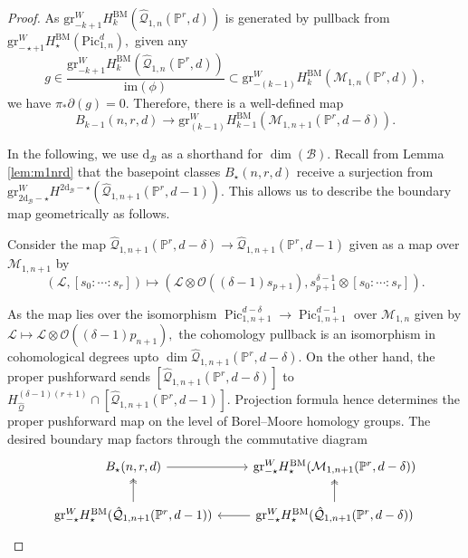 \documentclass[12pt,reqno]{amsart}
\theoremstyle{definition}
\theoremstyle{definition}
\theoremstyle{definition}
\theoremstyle{definition}
\DeclareMathOperator{\Pic}{Pic}
\newcommand{\PP}{\mathbb{P}}
\newcommand{\gr}{\mathrm{gr}}
\begin{document}
\begin{proof}
  As $\mathrm{gr}^W_{-k+1}H_k^{\mathrm{BM}}(\hat{\mathcal{Q}}_{1,n}(\mathbb{P}^r,d))$ is generated by pullback from $\mathrm{gr}^W_{-\star+1}H_\star^{\mathrm{BM}}({\mathrm{Pic}}^d_{1,n}),$ given any $$g\in \frac{\mathrm{gr}^W_{-k+1}H_k^{\mathrm{BM}}(\hat{\mathcal{Q}}_{1,n}(\mathbb{P}^r,d))}{\mathrm{im}(\phi)}\subset \gr^W_{-(k-1)}H_k^{\mathrm{BM}}(\mathcal{M}_{1,n}(\PP^r,d)),$$ we have $\pi_* \partial (g) = 0.$ Therefore, there is a well-defined map $$B_{k-1}(n,r,d)\to \gr^W_{(k-1)}H_{k-1}^{\mathrm{BM}}(\mathcal{M}_{1,n+1}(\PP^r,d-\delta)).$$

  In the following, we use $\mathrm{d}_\mathcal{B}$ as a shorthand for $\dim(\mathcal{B}).$ Recall from Lemma \ref{lem:m1nrd} that the basepoint classes $B_{\star}(n,r,d)$ receive a surjection from $\gr^W_{2\mathrm{d}_\mathcal{B}-\star}H^{2\mathrm{d}_\mathcal{B}-\star}(\hat{\mathcal{Q}}_{1,n+1}(\PP^r,d-1)).$ This allows us to describe the boundary map geometrically as follows.

  Consider the map $\hat{\mathcal{Q}}_{1,n+1}(\PP^r,d-\delta)\to \hat{\mathcal{Q}}_{1,n+1}(\PP^r,d-1)$ given as a map over $\mathcal{M}_{1,n+1}$ by $$(\mathcal{L}, [s_0:\cdots:s_r])\mapsto (\mathcal{L}\otimes \mathcal{O}((\delta-1)s_{p+1}), s_{p+1}^{\delta-1}\otimes [s_0:\cdots:s_r]).$$

  As the map lies over the isomorphism $\Pic_{1,n+1}^{d-\delta}\to \Pic_{1,n+1}^{d-1}$ over $\mathcal{M}_{1,n}$ given by $\mathcal{L}\mapsto \mathcal{L}\otimes \mathcal{O}((\delta-1)p_{n+1}),$ the cohomology pullback is an isomorphism in cohomological degrees upto $\dim \hat{\mathcal{Q}}_{1,n+1}(\PP^r,d-\delta).$ On the other hand, the proper pushforward sends $[\hat{\mathcal{Q}}_{1,n+1}(\PP^r,d-\delta)]$ to $H_{\hat{\mathcal{Q}}}^{(\delta-1)(r+1)}\cap [\hat{\mathcal{Q}}_{1,n+1}(\PP^r,d-1)].$ Projection formula hence determines the proper pushforward map on the level of Borel--Moore homology groups. The desired boundary map factors through the commutative diagram \[\begin{tikzcd}
	{B_{\star}(n,r,d)} & {\mathrm{gr}^W_{-\star}H_{\star}^{\mathrm{BM}}({\mathcal{M}}_{1,n+1}(\PP^r,d-\delta))} \\
	{\mathrm{gr}^W_{-\star}H_{\star}^{\mathrm{BM}}({\hat{\mathcal{Q}}}_{1,n+1}(\PP^r,d-1))} & {\mathrm{gr}^W_{-\star}H_{\star}^{\mathrm{BM}}({\hat{\mathcal{Q}}}_{1,n+1}(\PP^r,d-\delta))}
	\arrow[from=1-1, to=1-2]
	\arrow[two heads, from=2-1, to=1-1]
	\arrow[from=2-2, to=2-1]
	\arrow[two heads, from=2-2, to=1-2]
\end{tikzcd}\]
\end{proof}
\end{document}

